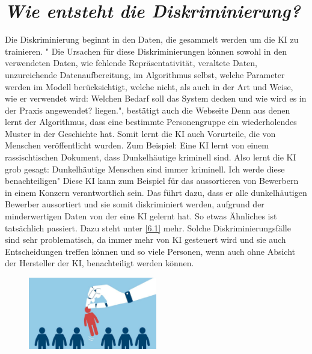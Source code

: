 \documentclass{article}
\begin{document}
\section{\textit{Wie entsteht die Diskriminierung?}}
Die Diskriminierung beginnt in den Daten, die gesammelt werden um die KI zu trainieren. " Die Ursachen für diese Diskriminierungen können sowohl in den verwendeten Daten, wie fehlende Repräsentativität, veraltete Daten, unzureichende Datenaufbereitung, im Algorithmus selbst, welche Parameter werden im Modell berücksichtigt, welche nicht, als auch in der Art und Weise, wie er verwendet wird: Welchen Bedarf soll das System decken und wie wird es in der Praxis angewendet? liegen.", bestätigt auch die Webseite \citep{DiskriminierendeAlgorithmen}  Denn aus denen lernt der Algorithmus, dass eine bestimmte Personengruppe ein wiederholendes Muster in der Geschichte hat. Somit lernt die KI auch Vorurteile, die von Menschen veröffentlicht wurden. Zum Beispiel: Eine KI lernt von einem rassischtischen Dokument, dass Dunkelhäutige kriminell sind. Also lernt die KI grob gesagt: Dunkelhäutige Menschen sind immer kriminell. Ich werde diese benachteiligen" Diese KI kann zum Beispiel für das aussortieren von Bewerbern in einem Konzern verantwortlich sein. Das führt dazu, dass er alle dunkelhäutigen Bewerber aussortiert und sie somit diskriminiert werden, aufgrund der minderwertigen Daten von der eine KI gelernt hat. So etwas Ähnliches ist tatsächlich passiert. Dazu steht unter \ref{6.1} mehr. Solche Diskriminierungsfälle sind sehr problematisch, da immer mehr von KI gesteuert wird und sie auch Entscheidungen treffen können und so viele Personen, wenn auch ohne Absicht der Hersteller der KI, benachteiligt werden können. 

\begin{figure}[ht]
    \centering
    \includegraphics[width=0.5\textwidth]{KI Diskriminierung 2.jpg}
    \caption{}
\label{fig:Diskriminierung}
\end{figure}
\end{document}
